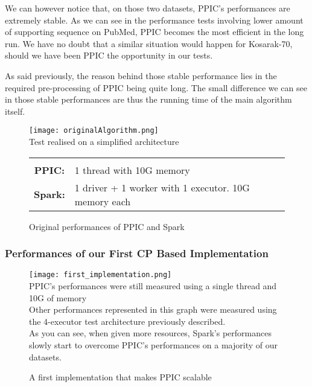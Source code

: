 \documentclass{eplmastersthesis}
\newcommand\danger{%
 \makebox[1.4em][c]{%
 \makebox[0pt][c]{\raisebox{.1em}{\small!}}%
 \makebox[0pt][c]{\color{red}\Large$\bigtriangleup$}}}%
\begin{document}
We can however notice that, on those two datasets, PPIC's performances are extremely stable. As we can see in the performance tests involving lower amount of supporting sequence on PubMed, PPIC becomes the most efficient in the long run. We have no doubt that a similar situation would happen for Kosarak-70, should we have been PPIC the opportunity in our tests. \newline

As said previously, the reason behind those stable performance lies in the required pre-processing of PPIC being quite long. The small difference we can see in those stable performances are thus the running time of the main algorithm itself.

\begin{figure}[h]
  \centering
  \texttt{[image: originalAlgorithm.png]} \\
  \danger  Test realised on a simplified architecture \danger \\
  \begin{tabular}{c l}
  	 & \\
  	\textbf{PPIC:} & 1 thread  with 10G memory \\
  	\textbf{Spark:} & 1 driver + 1 worker with 1 executor. 10G memory each
  \end{tabular}
  \caption{Original performances of PPIC and Spark}
  \label{fig:originalAlgorithmPerformances}
\end{figure}

\subsubsection{Performances of our First CP Based Implementation}

\begin{figure}[h]
  \centering
  \texttt{[image: first\_implementation.png]} \\
  \danger PPIC's performances were still measured using a single thread and 10G of memory \danger \\
  Other performances represented in this graph were measured using the 4-executor test architecture previously described. \\
  As you can see, when given more resources, Spark's performances slowly start to overcome PPIC's performances on a majority of our datasets. 
  \caption{A first implementation that makes PPIC scalable}
  \label{fig:first_scalable_CPbased_implementation}
\end{figure}
\end{document}

